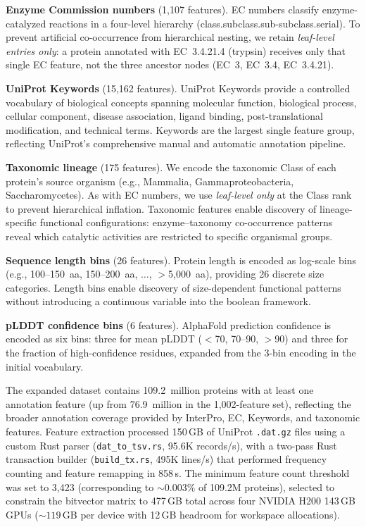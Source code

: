 \textbf{Enzyme Commission numbers} (1,107 features).
EC numbers classify enzyme-catalyzed reactions in a four-level hierarchy
(class.subclass.sub-subclass.serial). To prevent artificial co-occurrence from
hierarchical nesting, we retain \emph{leaf-level entries only}: a protein
annotated with EC~3.4.21.4 (trypsin) receives only that single EC feature,
not the three ancestor nodes (EC~3, EC~3.4, EC~3.4.21).

\textbf{UniProt Keywords} (15,162 features).
UniProt Keywords provide a controlled vocabulary of biological concepts
spanning molecular function, biological process, cellular component, disease
association, ligand binding, post-translational modification, and technical
terms. Keywords are the largest single feature group, reflecting UniProt's
comprehensive manual and automatic annotation pipeline.

\textbf{Taxonomic lineage} (175 features).
We encode the taxonomic Class of each protein's source organism (e.g.,
Mammalia, Gammaproteobacteria, Saccharomycetes). As with EC numbers, we use
\emph{leaf-level only} at the Class rank to prevent hierarchical inflation.
Taxonomic features enable discovery of lineage-specific functional
configurations: enzyme--taxonomy co-occurrence patterns reveal which catalytic
activities are restricted to specific organismal groups.

\textbf{Sequence length bins} (26 features).
Protein length is encoded as log-scale bins (e.g., 100--150~aa, 150--200~aa,
$\ldots$, $>$5{,}000~aa), providing 26 discrete size categories. Length bins
enable discovery of size-dependent functional patterns without introducing a
continuous variable into the boolean framework.

\textbf{pLDDT confidence bins} (6 features).
AlphaFold prediction confidence is encoded as six bins: three for mean pLDDT
($<$70, 70--90, $>$90) and three for the fraction of high-confidence residues,
expanded from the 3-bin encoding in the initial vocabulary.

The expanded dataset contains 109.2~million proteins with at least one
annotation feature (up from 76.9~million in the 1,002-feature set), reflecting
the broader annotation coverage provided by InterPro, EC, Keywords, and
taxonomic features. Feature extraction processed 150\,GB of UniProt
\texttt{.dat.gz} files using a custom Rust parser (\texttt{dat\_to\_tsv.rs},
95.6K records/s), with a two-pass Rust transaction builder
(\texttt{build\_tx.rs}, 495K lines/s) that performed frequency counting and
feature remapping in 858\,s. The minimum feature count threshold was set to
3,423 (corresponding to ${\sim}0.003\%$ of 109.2M proteins), selected to
constrain the bitvector matrix to 477\,GB total across four NVIDIA H200
143\,GB GPUs (${\sim}119$\,GB per device with 12\,GB headroom for workspace
allocations).


